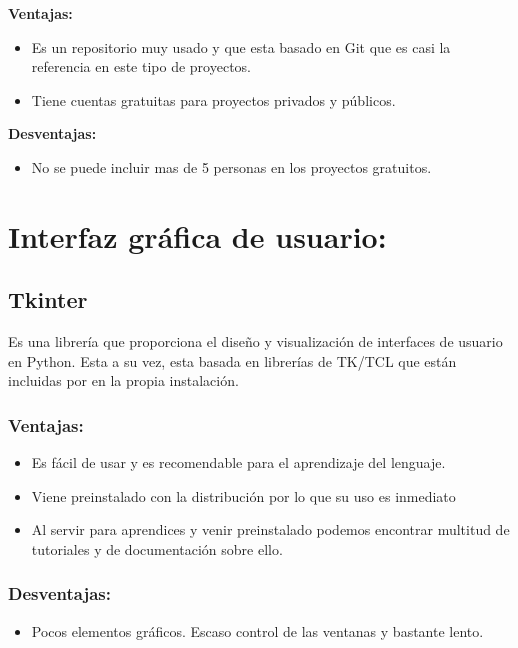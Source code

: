 \textbf{Ventajas:}
\begin{itemize}

\item Es un repositorio muy usado y que esta basado en Git que es casi la referencia en este tipo de proyectos.

\item Tiene cuentas gratuitas para proyectos privados y públicos.

\end{itemize}

\textbf{Desventajas:}

\begin{itemize}
\item No se puede incluir mas de 5 personas en los proyectos gratuitos.
\end{itemize}



\section{Interfaz gráfica de usuario:}
\subsection{Tkinter}
Es una librería que proporciona el diseño y visualización de interfaces de usuario en Python. Esta a su vez, esta basada en librerías de TK/TCL que están incluidas por en la propia instalación.

\subsubsection{Ventajas:}
\begin{itemize}
\item Es fácil de usar y es recomendable para el aprendizaje del lenguaje.

\item Viene preinstalado con la distribución por lo que su uso es inmediato

\item Al servir para aprendices y venir preinstalado podemos encontrar multitud de tutoriales y de documentación sobre ello.
\end{itemize}

\subsubsection{Desventajas:}
\begin{itemize}
\item Pocos elementos gráficos. Escaso control de las ventanas y bastante lento.
\end{itemize}

